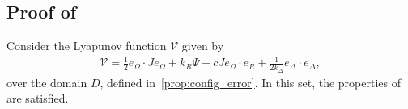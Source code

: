 \documentclass[10pt,fleqn]{IJCAS}  %
\begin{document}
\begin{multicols}{2}
\subsection{Proof of~}\label{proof:adaptive_control}
Consider the Lyapunov function \( \mathcal{V} \) given by
\begin{align*}
	\mathcal{V} = \frac{1}{2} e_\Omega \cdot J e_\Omega + k_R \Psi + c J e_\Omega \cdot e_R + \frac{1}{2 k_\Delta} e_\Delta \cdot e_\Delta , %
\end{align*}
over the domain \( D \), defined in~\cref{prop:config_error}. 
In this set, the properties of~ are satisfied.


\end{multicols}
\end{document}
